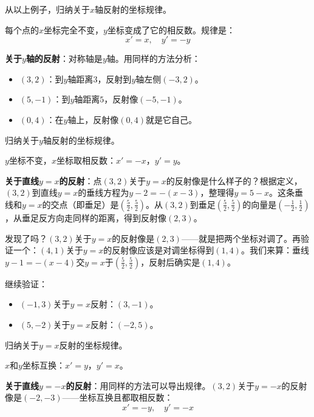 \begin{example}
从以上例子，归纳关于$x$轴反射的坐标规律。
\end{example}
\begin{solution}
每个点的$x$坐标完全不变，$y$坐标变成了它的相反数。规律是：
\[
x'=x,\quad y'=-y
\]
\end{solution}

\textbf{关于$y$轴的反射}：对称轴是$y$轴。用同样的方法分析：
\begin{itemize}
\item $(3,2)$：到$y$轴距离$3$，反射到$y$轴左侧$(-3,2)$。
\item $(5,-1)$：到$y$轴距离$5$，反射像$(-5,-1)$。
\item $(0,4)$：在$y$轴上，反射像$(0,4)$就是它自己。
\end{itemize}

\begin{example}
归纳关于$y$轴反射的坐标规律。
\end{example}
\begin{solution}
$y$坐标不变，$x$坐标取相反数：$x'=-x$，$y'=y$。
\end{solution}

\textbf{关于直线$y=x$的反射}：点$(3,2)$关于$y=x$的反射像是什么样子的？根据定义，$(3,2)$到直线$y=x$的垂线方程为$y-2=-(x-3)$，整理得$y=5-x$。这条垂线和$y=x$的交点（即垂足）是$(\frac52,\frac52)$。从$(3,2)$到垂足$(\frac52,\frac52)$的向量是$(-\frac12,\frac12)$，从垂足反方向走同样的距离，得到反射像$(2,3)$。

发现了吗？$(3,2)$关于$y=x$的反射像是$(2,3)$——就是把两个坐标对调了。再验证一个：$(4,1)$关于$y=x$的反射像应该是对调坐标得到$(1,4)$。我们来算：垂线$y-1=-(x-4)$交$y=x$于$(\frac52,\frac52)$，反射后确实是$(1,4)$。

继续验证：
\begin{itemize}
\item $(-1,3)$关于$y=x$反射：$(3,-1)$。
\item $(5,-2)$关于$y=x$反射：$(-2,5)$。
\end{itemize}

\begin{example}
归纳关于$y=x$反射的坐标规律。
\end{example}
\begin{solution}
$x$和$y$坐标互换：$x'=y$，$y'=x$。
\end{solution}

\textbf{关于直线$y=-x$的反射}：用同样的方法可以导出规律。$(3,2)$关于$y=-x$的反射像是$(-2,-3)$——坐标互换且都取相反数：
\[
x'=-y,\quad y'=-x
\]

